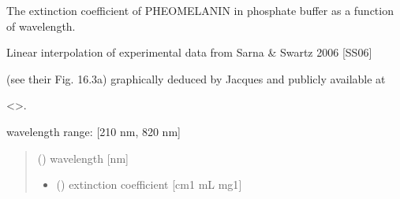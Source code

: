 \documentclass[letterpaper,10pt,english]{sphinxmanual}
\begin{document}

\begin{fulllineitems}
\label{\detokenize{03_absorption_coefficient:skinoptics.absorption_coefficient.ext_phe_Sarna}}
\pysigstartsignatures
{}
\pysigstopsignatures
\begin{DUlineblock}{0em}
\item[] The extinction coefficient of PHEOMELANIN in phosphate buffer as a function of wavelength.
\item[] Linear interpolation of experimental data from Sarna \& Swartz 2006 {[}SS06{]}
\item[] (see their Fig. 16.3\sphinxhyphen{}a) graphically deduced by Jacques and publicly available at
\item[] \textless{}\textgreater{}.
\end{DUlineblock}

\begin{DUlineblock}{0em}
\item[] wavelength range: {[}210 nm, 820 nm{]}
\end{DUlineblock}
\begin{quote}\begin{description}
\sphinxAtStartPar
{} () \textendash{} wavelength {[}nm{]}

\sphinxAtStartPar
\begin{itemize}
\item {} 
\sphinxAtStartPar
{} () \textendash{} extinction coefficient {[}cm\sphinxhyphen{}1 mL mg\sphinxhyphen{}1{]}

\end{itemize}


\end{description}\end{quote}

\end{fulllineitems}
\end{document}
